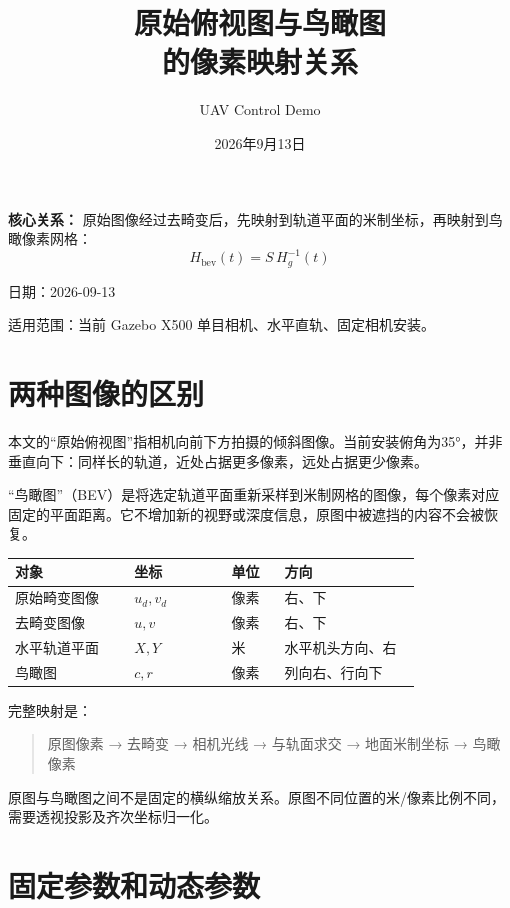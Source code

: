 \documentclass[UTF8,a4paper,11pt,fontset=windows]{ctexart}
\title{\bfseries 原始俯视图与鸟瞰图\\的像素映射关系}
\author{UAV Control Demo}
\date{2026年9月13日}
\begin{document}
\maketitle
\thispagestyle{fancy}
\noindent\textbf{核心关系：}
原始图像经过去畸变后，先映射到轨道平面的米制坐标，再映射到鸟瞰像素网格：
\[
\boxed{H_{\mathrm{bev}}(t)=S\,H_g^{-1}(t)}
\]

日期：2026-09-13

适用范围：当前 Gazebo X500 单目相机、水平直轨、固定相机安装。


\section{两种图像的区别}

本文的“原始俯视图”指相机向前下方拍摄的倾斜图像。当前安装俯角为35°，并非垂直向下：同样长的轨道，近处占据更多像素，远处占据更少像素。


“鸟瞰图”（BEV）是将选定轨道平面重新采样到米制网格的图像，每个像素对应固定的平面距离。它不增加新的视野或深度信息，原图中被遮挡的内容不会被恢复。


{\small\setlength{\tabcolsep}{3pt}\begin{longtable}{>{\raggedright\arraybackslash}p{0.27\linewidth}>{\raggedright\arraybackslash}p{0.22\linewidth}>{\raggedright\arraybackslash}p{0.12\linewidth}>{\raggedright\arraybackslash}p{0.31\linewidth}}\toprule
\textbf{对象} & \textbf{坐标} & \textbf{单位} & \textbf{方向}\\\midrule\endhead
原始畸变图像 & \(u_d,v_d\) & 像素 & 右、下\\
去畸变图像 & \(u,v\) & 像素 & 右、下\\
水平轨道平面 & \(X,Y\) & 米 & 水平机头方向、右\\
鸟瞰图 & \(c,r\) & 像素 & 列向右、行向下\\
\bottomrule\end{longtable}}

完整映射是：


\begin{quote}\small 原图像素 → 去畸变 → 相机光线 → 与轨面求交 → 地面米制坐标 → 鸟瞰像素\end{quote}

原图与鸟瞰图之间不是固定的横纵缩放关系。原图不同位置的米/像素比例不同，需要透视投影及齐次坐标归一化。


\section{固定参数和动态参数}
\end{document}
